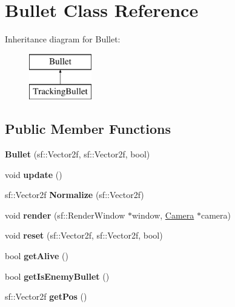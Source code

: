 \hypertarget{class_bullet}{}\section{Bullet Class Reference}
\label{class_bullet}
Inheritance diagram for Bullet\+:\begin{figure}[H]
\begin{center}
\leavevmode
\includegraphics[height=2.000000cm]{class_bullet}
\end{center}
\end{figure}
\subsection*{Public Member Functions}
\begin{DoxyCompactItemize}
\item 
\mbox{\label{class_bullet_a77d3b716065155100cb36b354d946cfa}} 
{\bfseries Bullet} (sf\+::\+Vector2f, sf\+::\+Vector2f, bool)
\item 
\mbox{\label{class_bullet_a32f4a0611fe2dd245fee955d14ca1f68}} 
void {\bfseries update} ()
\item 
\mbox{\label{class_bullet_a76ff2859d498ae4f04185bde59139761}} 
sf\+::\+Vector2f {\bfseries Normalize} (sf\+::\+Vector2f)
\item 
\mbox{\label{class_bullet_ae10a23ad456a1c093ff5ac284776fbaa}} 
void {\bfseries render} (sf\+::\+Render\+Window $\ast$window, \hyperlink{class_camera}{Camera} $\ast$camera)
\item 
\mbox{\label{class_bullet_a4c8a3cbe18fadf1c5ed5f2a4322f311a}} 
void {\bfseries reset} (sf\+::\+Vector2f, sf\+::\+Vector2f, bool)
\item 
\mbox{\label{class_bullet_a75b9dbc9c7dc5f0dda65759bc895ac10}} 
bool {\bfseries get\+Alive} ()
\item 
\mbox{\label{class_bullet_a9553313fc54ced53b8f0952f519c0d8d}} 
bool {\bfseries get\+Is\+Enemy\+Bullet} ()
\item 
\mbox{\label{class_bullet_aa0163d91e28a47cd89cfdda4923bd30a}} 
sf\+::\+Vector2f {\bfseries get\+Pos} ()
\end{DoxyCompactItemize}
